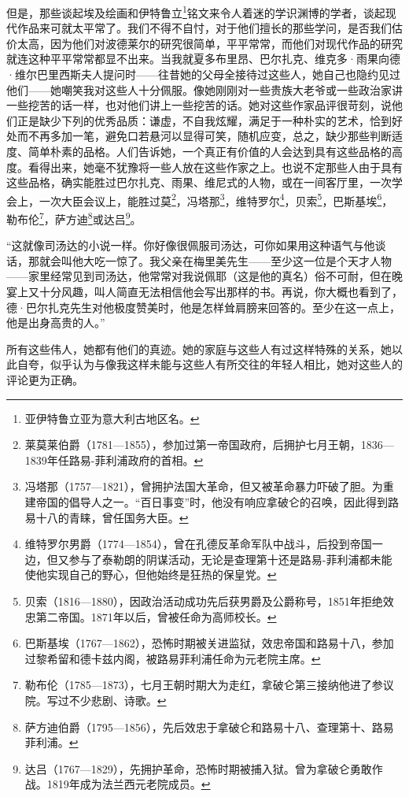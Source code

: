 \par 但是，那些谈起埃及绘画和伊特鲁立\footnote{亚伊特鲁立亚为意大利古地区名。}铭文来令人着迷的学识渊博的学者，谈起现代作品来可就太平常了。我们不得不自忖，对于他们擅长的那些学问，是否我们估价太高，因为他们对波德莱尔的研究很简单，平平常常，而他们对现代作品的研究就连这种平平常常都显不出来。当我就夏多布里昂、巴尔扎克、维克多·雨果向德·维尔巴里西斯夫人提问时——往昔她的父母全接待过这些人，她自己也隐约见过他们——她嘲笑我对这些人十分佩服。像她刚刚对一些贵族大老爷或一些政治家讲一些挖苦的话一样，也对他们讲上一些挖苦的话。她对这些作家品评很苛刻，说他们正是缺少下列的优秀品质：谦虚，不自我炫耀，满足于一种朴实的艺术，恰到好处而不再多加一笔，避免口若悬河以显得可笑，随机应变，总之，缺少那些判断适度、简单朴素的品格。人们告诉她，一个真正有价值的人会达到具有这些品格的高度。看得出来，她毫不犹豫将一些人放在这些作家之上。也说不定那些人由于具有这些品格，确实能胜过巴尔扎克、雨果、维尼式的人物，或在一间客厅里，一次学会上，一次大臣会议上，能胜过莫\footnote{莱莫莱伯爵（1781—1855），参加过第一帝国政府，后拥护七月王朝，1836—1839年任路易-菲利浦政府的首相。}，冯塔那\footnote{冯塔那（1757—1821），曾拥护法国大革命，但又被革命暴力吓破了胆。为重建帝国的倡导人之一。“百日事变”时，他没有响应拿破仑的召唤，因此得到路易十八的青睐，曾任国务大臣。}，维特罗尔\footnote{维特罗尔男爵（1774—1854），曾在孔德反革命军队中战斗，后投到帝国一边，但又参与了泰勒朗的阴谋活动，无论是查理第十还是路易-菲利浦都未能使他实现自己的野心，但他始终是狂热的保皇党。}，贝索\footnote{贝索（1816—1880），因政治活动成功先后获男爵及公爵称号，1851年拒绝效忠第二帝国。1871年以后，曾被任命为高师校长。}，巴斯基埃\footnote{巴斯基埃（1767—1862），恐怖时期被关进监狱，效忠帝国和路易十八，参加过黎希留和德卡兹内阁，被路易菲利浦任命为元老院主席。}，勒布伦\footnote{勒布伦（1785—1873），七月王朝时期大为走红，拿破仑第三接纳他进了参议院。写过不少悲剧、诗歌。}，萨方迪\footnote{萨方迪伯爵（1795—1856），先后效忠于拿破仑和路易十八、查理第十、路易菲利浦。}或达吕\footnote{达吕（1767—1829），先拥护革命，恐怖时期被捕入狱。曾为拿破仑勇敢作战。1819年成为法兰西元老院成员。}。
\par “这就像司汤达的小说一样。你好像很佩服司汤达，可你如果用这种语气与他谈话，那就会叫他大吃一惊了。我父亲在梅里美先生——至少这一位是个天才人物——家里经常见到司汤达，他常常对我说佩耶（这是他的真名）俗不可耐，但在晚宴上又十分风趣，叫人简直无法相信他会写出那样的书。再说，你大概也看到了，德·巴尔扎克先生对他极度赞美时，他是怎样耸肩膀来回答的。至少在这一点上，他是出身高贵的人。”
\par 所有这些伟人，她都有他们的真迹。她的家庭与这些人有过这样特殊的关系，她以此自夸，似乎认为与像我这样未能与这些人有所交往的年轻人相比，她对这些人的评论更为正确。
